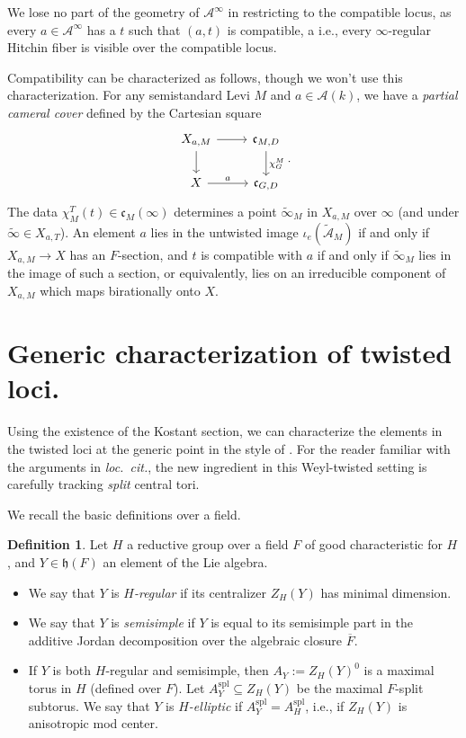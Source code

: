 \documentclass[openany]{amsbook}
\theoremstyle{definition}
\newtheorem{definition}[theorem]{Definition}
\theoremstyle{remark}
\numberwithin{equation}{section}
\newcommand{\cA}{\mathcal{A}}
\newcommand{\ol}[1]{\overline{#1}}
\renewcommand{\-}{\operatorname{-}}
\newcommand{\wtilde}[1]{\widetilde{#1}}
\newcommand{\ctA}{\widetilde{\cA}}
\newcommand{\fc}{\mathfrak{c}}
\newcommand{\fh}{\mathfrak{h}}
\newcommand{\spl}{\mathrm{spl}}
\begin{document}
We lose no part of the geometry of $\cA^{\infty}$ in restricting to the compatible locus, as every $a \in \cA^{\infty}$ has a $t$ such that $(a, t)$ is compatible, a i.e., every $\infty$-regular Hitchin fiber is visible over the compatible locus. 


Compatibility can be characterized as follows, though we won't use this characterization. For any semistandard Levi $M$ and $a \in \cA(k)$, we have a \emph{partial cameral cover} defined by the Cartesian square
$$
    \begin{tikzcd}[ampersand replacement=\&]
        X_{a,M} \ar[r] \ar[d] \& \fc_{M,D} \ar[d, "\chi^M_G"] \\
        X \ar[r, "a"] \& \fc_{G,D}
    \end{tikzcd}.
$$
The data $\chi^T_M(t) \in \fc_M(\infty)$ determines a point $\wtilde{\infty}_M$ in $X_{a,M}$ over $\infty$ (and under $\wtilde{\infty} \in X_{a,T}$). An element $a$ lies in the untwisted image $\iota_e(\ctA_M)$ if and only if $X_{a,M} \to X$ has an $F$-section, and $t$ is compatible with $a$ if and only if $\wtilde{\infty}_M$ lies in the image of such a section, or equivalently, lies on an irreducible component of $X_{a,M}$ which maps birationally onto $X$.



\section{Generic characterization of twisted loci.} 
Using the existence of the Kostant section, we can characterize the elements in the twisted loci at the generic point in the style of \cite[\S 3.9]{CLI}. For the reader familiar with the arguments in \textit{loc.\ cit.}, the new ingredient in this Weyl-twisted setting is carefully tracking \textit{split} central tori.

We recall the basic definitions over a field. 
\begin{definition}
    Let $H$ a reductive group over a field $F$ of good characteristic for $H$, and $Y \in \fh(F)$ an element of the Lie algebra. 
    \begin{itemize}
        \item We say that $Y$ is \emph{$H$-regular} if its centralizer $Z_H(Y)$ has minimal dimension.
        \item We say that $Y$ is \emph{semisimple} if $Y$ is equal to its semisimple part in the additive Jordan decomposition over the algebraic closure $\ol{F}$.
        \item If $Y$ is both $H$-regular and semisimple, then $A_Y := Z_H(Y)^0$ is a maximal torus in $H$ (defined over $F$). Let $A_Y^{\spl} \subseteq Z_H(Y)$ be the maximal $F$-split subtorus. We say that $Y$ is \emph{$H$-elliptic} if $A_Y^{\spl} = A^{\spl}_H$, i.e., if $Z_H(Y)$ is anisotropic mod center.
    \end{itemize}
\end{definition}
\end{document}

